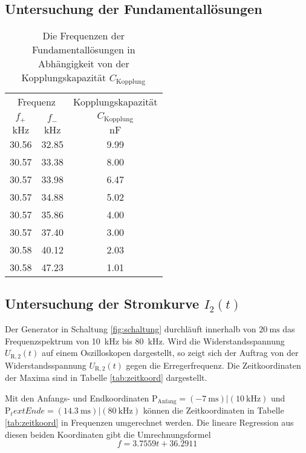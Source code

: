 \subsection{Untersuchung der Fundamentallösungen}
\label{sec:Auswertung2}
\begin{table}
	\centering
	\begin{tabular}{ccc}
	\toprule
	\multicolumn{2}{c}{Frequenz}&{Kopplungskapazität}\\
	{$f_\mathup{+}$}&{$f_\mathup{-}$}&{$C_\mathup{Kopplung}$}\\
	{$\si{\kilo\hertz}$}&{$\si{\kilo\hertz}$}&{$\si{\nano\farad}$}\\
	\midrule
		30.56	&32.85	&9.99\\
		30.57	&33.38	&8.00\\
		30.57	&33.98	&6.47\\
		30.57	&34.88	&5.02\\
		30.57	&35.86	&4.00\\
		30.57	&37.40	&3.00\\
		30.58	&40.12	&2.03\\
		30.58	&47.23	&1.01\\
	\bottomrule
	\end{tabular}
	\caption{Die Frequenzen der Fundamentallösungen in Abhängigkeit von der Kopplungskapazität $C_\mathup{Kopplung}$}
\end{table}

\subsection{Untersuchung der Stromkurve $I_2(t)$}
\label{sec:Auswertung2}
Der Generator in Schaltung \ref{fig:schaltung} durchläuft innerhalb von $\SI{20}{\milli\second}$ 
das Frequenzspektrum von \SI{10}{\kilo\hertz} bis \SI{80}{\kilo\hertz}. 
Wird die Widerstandsspannung $U_\mathup{R,2}(t)$ auf einem Oszilloskopen dargestellt, so zeigt sich der Auftrag von der Widerstandsspannung $U_\mathup{R,2}(t)$
gegen die Erregerfrequenz.
Die Zeitkoordinaten der Maxima sind in Tabelle \ref{tab:zeitkoord} dargestellt.

Mit den Anfangs- und Endkoordinaten
$\text{P}_\text{Anfang}=(\SI{-7}{\milli\second})|(\SI{10}{\kilo\hertz})$ und $\text{P}_text{Ende}=(\SI{14,3}{\milli\second})|(\SI{80}{\kilo\hertz})$ können die Zeitkoordinaten in Tabelle \ref{tab:zeitkoord} in Frequenzen umgerechnet werden.
Die lineare Regression aus diesen beiden Koordinaten gibt die Umrechnungsformel
\begin{equation}
	f = 3.7559t+36.2911
\end{equation}

